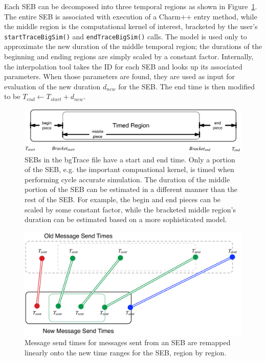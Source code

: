 Each SEB can be decomposed into three temporal regions as shown in Figure~\ref{event_diagram}. 
The entire SEB is associated with execution of a Charm++ entry method, while the middle region
is the computational kernel of interest, bracketed by the user's \texttt{startTraceBigSim()} and  \texttt{endTraceBigSim()} calls. The model is used only to approximate the new duration of the middle temporal region;
the durations of the beginning and ending regions are simply scaled by a constant factor.
Internally, the interpolation tool takes the ID for each SEB and looks up its associated parameters.
When those parameters are found, they are used as input for evaluation of the new duration $d_{new}$
for the SEB. The end time is then modified to be $T_{end}\leftarrow  T_{start}+d_{new}$.

\begin{figure}
\centering
\includegraphics[width=5in]{figures/event_diagram}
\caption{SEBs in the bgTrace file have a start and end time. Only a portion of the SEB, e.g. the important compuational kernel, is timed when performing cycle accurate simulation. The duration of the middle portion of the SEB can be estimated in a different manner than the rest of the SEB. For example, the begin and end pieces can be scaled by some constant factor, while the bracketed middle region's duration can be estimated based on a more
sophisticated model.
\label{event_diagram}}
\end{figure}

\begin{figure}
\centering
\includegraphics[width=6in]{figures/event_diagram2}
\caption{Message send times for messages sent from an SEB are remapped linearly onto the new time ranges for the 
SEB, region by region.
\label{event_diagram2}}
\end{figure}

